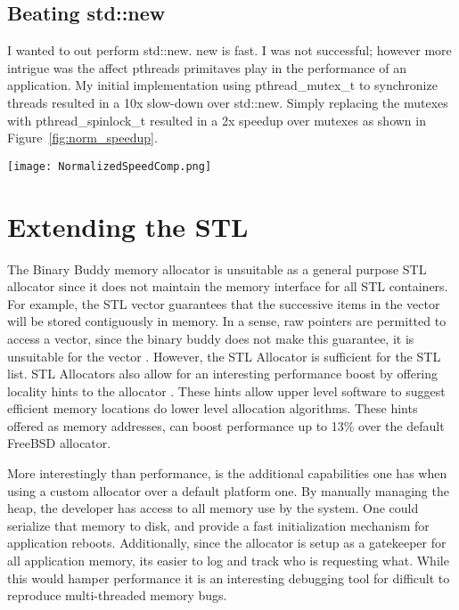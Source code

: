 \documentclass[12pt]{article}
\begin{document}
\subsection{Beating std::new}
I wanted to out perform std::new. new is fast. I was not successful; however
more intrigue was the affect pthreads primitaves play in the performance of an
application. My initial implementation using pthread\_mutex\_t to synchronize
threads resulted in a 10x slow-down over std::new.  Simply replacing the mutexes
with pthread\_spinlock\_t resulted in a 2x speedup over mutexes as shown in
Figure~\ref{fig:norm_speedup}.  

\begin{figure*}
    \begin{center}
        \texttt{[image: NormalizedSpeedComp.png]}
        \caption{On a multicore machine, spinlocks result in better performance
        over mutexes}
        \label{fig:norm_speedup}
    \end{center}
\end{figure*}

\section{Extending the STL}
The Binary Buddy memory allocator is unsuitable as a general purpose STL
allocator since it does not maintain the memory interface for all STL
containers. For example, the STL vector guarantees that the successive items in
the vector will be stored contiguously in memory. In a sense, raw pointers are
permitted to access a vector, since the binary buddy does not make this
guarantee, it is unsuitable for the vector \cite[p.~727]{cppstl}. However, the STL Allocator is
sufficient for the STL list. STL Allocators also allow for an interesting
performance boost by offering locality hints to the allocator \cite[p.~733]{cppstl}.
These hints allow upper level software to suggest efficient memory locations do
lower level allocation algorithms.  These hints offered as memory addresses, can
boost performance up to 13\% over the default FreeBSD allocator\cite{locality}.

More interestingly than performance, is the additional capabilities one has when
using a custom allocator over a default platform one.  By manually managing the
heap, the developer has access to all memory use by the system. One could
serialize that memory to disk, and provide a fast initialization mechanism for
application reboots.  Additionally, since the allocator is setup as a gatekeeper
for all application memory, its easier to log and track who is requesting what.
While this would hamper performance it is an interesting debugging tool for
difficult to reproduce multi-threaded memory bugs.
\end{document}

